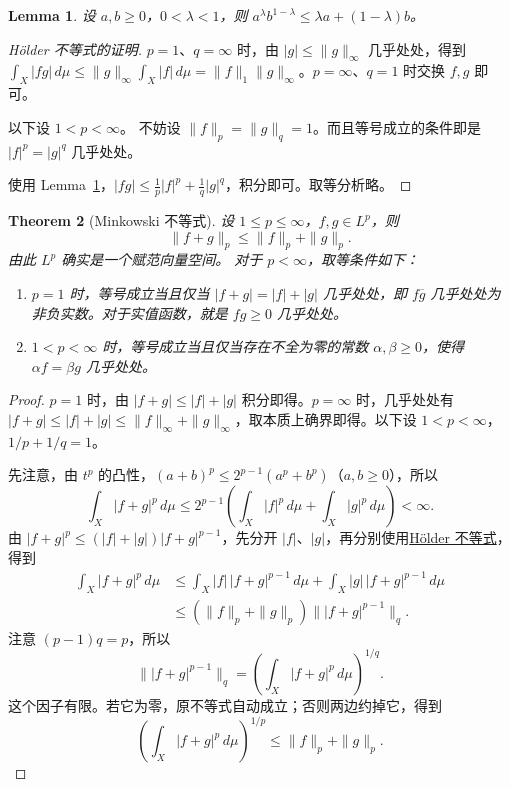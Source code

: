 \documentclass[12pt,letterpaper,twoside,openright]{ctexbook}
\theoremstyle{bluehead}
\newtheorem{theorem}{Theorem}
\newtheorem{lemma}[theorem]{Lemma}
\theoremstyle{olivehead}
\theoremstyle{orangehead}
\theoremstyle{redremark}
\begin{document}
\begin{lemma}\label{lem:weighted-am-gm}
设 $a,b\geq0$，$0<\lambda<1$，则 $a^\lambda b^{1-\lambda}\leq\lambda a+(1-\lambda)b$。
\end{lemma}

\begin{proof}[Hölder 不等式的证明]
$p=1$、$q=\infty$ 时，由 $|g|\leq\|g\|_\infty$ 几乎处处，得到 $\int_X|fg|\,d\mu\leq\|g\|_\infty\int_X|f|\,d\mu=\|f\|_1\|g\|_\infty$。$p=\infty$、$q=1$ 时交换 $f,g$ 即可。

以下设 $1<p<\infty$。
不妨设 $\|f\|_p=\|g\|_q=1$。而且等号成立的条件即是 $|f|^p=|g|^q$ 几乎处处。

使用 Lemma~\ref{lem:weighted-am-gm}，$|fg|\leq\frac1p|f|^p+\frac1q|g|^q$，积分即可。取等分析略。
\end{proof}
\begin{theorem}[Minkowski 不等式]\label{thm:minkowski-lp}
设 $1\leq p\leq\infty$，$f,g\in L^p$，则
\[
\|f+g\|_p\leq\|f\|_p+\|g\|_p.
\]
由此 $L^p$ 确实是一个赋范向量空间。
对于 $p<\infty$，取等条件如下：
\begin{enumerate}
\item[(1)] $p=1$ 时，等号成立当且仅当 $|f+g|=|f|+|g|$ 几乎处处，即 $f\overline g$ 几乎处处为非负实数。对于实值函数，就是 $fg\geq0$ 几乎处处。
\item[(2)] $1<p<\infty$ 时，等号成立当且仅当存在不全为零的常数 $\alpha,\beta\geq0$，使得 $\alpha f=\beta g$ 几乎处处。
\end{enumerate}\end{theorem}

\begin{proof}
$p=1$ 时，由 $|f+g|\leq|f|+|g|$ 积分即得。$p=\infty$ 时，几乎处处有 $|f+g|\leq|f|+|g|\leq\|f\|_\infty+\|g\|_\infty$，取本质上确界即得。以下设 $1<p<\infty$，$1/p+1/q=1$。

先注意，由 $t^p$ 的凸性，$(a+b)^p\leq2^{p-1}(a^p+b^p)$（$a,b\geq0$），所以
\[
\int_X|f+g|^p\,d\mu
\leq2^{p-1}\left(\int_X|f|^p\,d\mu+\int_X|g|^p\,d\mu\right)<\infty.
\]
由 $|f+g|^p\leq(|f|+|g|)|f+g|^{p-1}$，先分开 $|f|$、$|g|$，再分别使用\hyperref[thm:holder-lp]{Hölder 不等式}，得到
\[
\begin{aligned}
\int_X|f+g|^p\,d\mu
&\leq\int_X|f|\,|f+g|^{p-1}\,d\mu
+\int_X|g|\,|f+g|^{p-1}\,d\mu\\
&\leq(\|f\|_p+\|g\|_p)\bigl\||f+g|^{p-1}\bigr\|_q.
\end{aligned}
\]
注意 $(p-1)q=p$，所以
\[
\bigl\||f+g|^{p-1}\bigr\|_q
=\left(\int_X|f+g|^p\,d\mu\right)^{1/q}.
\]
这个因子有限。若它为零，原不等式自动成立；否则两边约掉它，得到
\[
\left(\int_X|f+g|^p\,d\mu\right)^{1/p}
\leq\|f\|_p+\|g\|_p.
\]
\end{proof}
\end{document}
